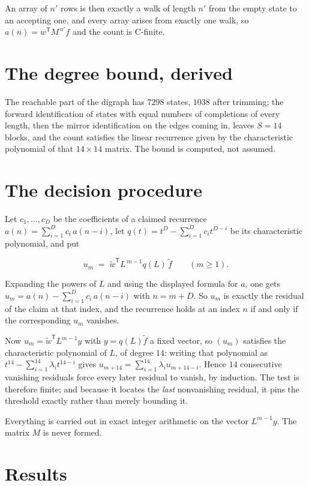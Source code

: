\documentclass[11pt]{article}
\theoremstyle{definition}
\begin{document}
An array of $n'$ rows is then exactly a walk of length $n'$ from the empty state to an accepting one, and every array arises from exactly one walk, so $a(n) = w^{\mathsf T}M^{\,n'}f$ and the count is C-finite.

\section{The degree bound, derived}

The reachable part of the digraph has $7298$ states, $1038$ after trimming; the forward identification of states with equal numbers of completions of every length, then the mirror identification on the edges coming in, leaves $S = 14$ blocks, and the count satisfies the linear recurrence given by the characteristic polynomial of that $14\times14$ matrix. The bound is computed, not assumed.

\section{The decision procedure}

Let $c_1,\dots,c_D$ be the coefficients of a claimed recurrence $a(n) = \sum_{i=1}^{D} c_i\,a(n-i)$, let $q(t) = t^{D} - \sum_{i=1}^{D} c_i t^{D-i}$ be its characteristic polynomial, and put

\[u_m \;=\; \tilde w^{\mathsf T} L^{\,m-1} q(L)\,\tilde f \qquad (m \ge 1).\]

Expanding the powers of $L$ and using the displayed formula for $a$, one gets $u_m = a(n) - \sum_{i=1}^{D} c_i\,a(n-i)$ with $n = m + D$. So $u_m$ is exactly the residual of the claim at that index, and the recurrence holds at an index $n$ if and only if the corresponding $u_m$ vanishes.

Now $u_m = \tilde w^{\mathsf T} L^{m-1} y$ with $y = q(L)\tilde f$ a fixed vector, so $(u_m)$ satisfies the characteristic polynomial of $L$, of degree $14$: writing that polynomial as $t^{14} - \sum_{i=1}^{14} \lambda_i t^{14-i}$ gives $u_{m+14} = \sum_{i=1}^{14} \lambda_i u_{m+14-i}$. Hence $14$ consecutive vanishing residuals force every later residual to vanish, by induction. The test is therefore finite; and because it locates the {\itshape last} nonvanishing residual, it pins the threshold exactly rather than merely bounding it.

Everything is carried out in exact integer arithmetic on the vector $L^{m-1}y$. The matrix $M$ is never formed.

\section{Results}
\end{document}
